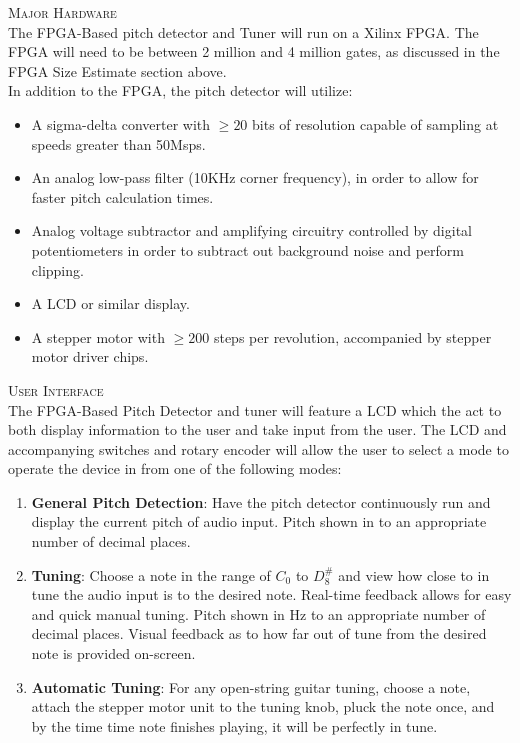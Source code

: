 \documentclass[aps,letterpaper,10pt]{revtex4}
\begin{document}
\noindent \textsc{\large Major Hardware}\\

The FPGA-Based pitch detector and Tuner will run on a Xilinx FPGA. The FPGA will need to be between 2 million and 4 million gates, as discussed in the FPGA Size Estimate section above. \\

In addition to the FPGA, the pitch detector will utilize:
\begin{itemize}
\item A sigma-delta converter with $\geq 20$ bits of resolution capable of sampling at speeds greater than 50Msps. 
\item An analog low-pass filter (10KHz corner frequency), in order to allow for faster pitch calculation times. 
\item Analog voltage subtractor and amplifying circuitry controlled by digital potentiometers in order to subtract out background noise and perform clipping. 
\item A LCD or similar display.
\item A stepper motor with $\geq 200$ steps per revolution, accompanied by stepper motor driver chips. 
\end{itemize}

\noindent \textsc{\large User Interface}\\

The FPGA-Based Pitch Detector and tuner will feature a LCD which the act to both display information to the user and take input from the user. The LCD and accompanying switches and rotary encoder will allow the user to select a mode to operate the device in from one of the following modes:
\begin{enumerate}
\item \textbf{General Pitch Detection}: Have the pitch detector continuously run and display the current pitch of audio input. Pitch shown in to an appropriate number of decimal places. 
\item \textbf{Tuning}: Choose a note in the range of  $C_0$ to $D^\#_8$ and view how close to in tune the audio input is to the desired note. Real-time feedback allows for easy and quick manual tuning. Pitch shown in Hz to an appropriate number of decimal places. Visual feedback as to how far out of tune from the desired note is provided on-screen.
\item \textbf{Automatic Tuning}: For any open-string guitar tuning, choose a note, attach the stepper motor unit to the tuning knob, pluck the note once, and by the time time note finishes playing, it will be perfectly in tune. 
\end{enumerate}
\end{document}
